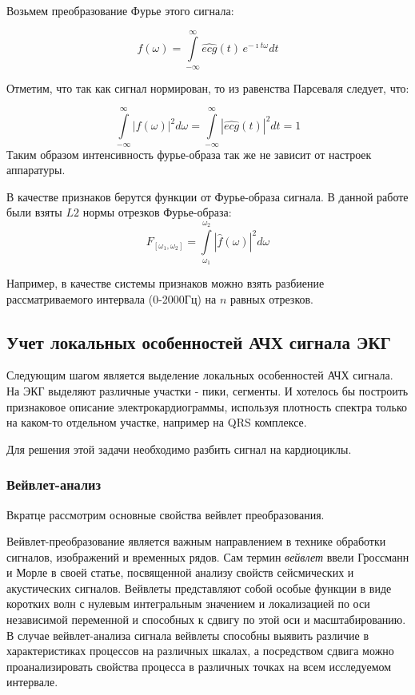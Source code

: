 \documentclass[a4paper,12pt]{extarticle}
\begin{document}
Возьмем преобразование Фурье этого сигнала:

$$f(\omega) = \int\limits_{-\infty}^{\infty} \widehat{ecg}(t)\, e^{-\imath t \omega} dt$$

Отметим, что так как сигнал нормирован, то из равенства Парсеваля следует, что:

$$ \int\limits_{-\infty}^{\infty} |f(\omega)|^2 d\omega =\int\limits_{-\infty}^{\infty} |\widehat{ecg}(t)|^2 dt = 1$$
Таким образом интенсивность фурье-образа так же не зависит от настроек аппаратуры.

В качестве признаков берутся функции от Фурье-образа сигнала. В данной работе были взяты $L2$ нормы отрезков Фурье-образа:
$$ F_[\omega_1, \omega_2] = \int\limits_{\omega_1}^{\omega_2} |\widehat{f}(\omega)|^2 d\omega $$

Например, в качестве системы признаков можно взять разбиение рассматриваемого интервала (0-2000Гц) на $n$ равных отрезков.

\subsection{Учет локальных особенностей АЧХ сигнала ЭКГ}

Следующим шагом является выделение локальных особенностей АЧХ сигнала. На ЭКГ выделяют различные участки - пики, сегменты. И хотелось бы построить признаковое описание электрокардиограммы, используя плотность спектра только на каком-то отдельном участке, например на QRS комплексе.

Для решения этой задачи необходимо разбить сигнал на кардиоциклы.

\subsubsection{Вейвлет-анализ}

Вкратце рассмотрим основные свойства вейвлет преобразования\cite{IntroWavelet03,WaveExampl10}.

Вейвлет-преобразование является важным направлением в технике обработки сигналов, изображений и временных рядов. Сам термин \textit{вейвлет} ввели Гроссманн и Морле в своей статье, посвященной анализу свойств сейсмических и акустических сигналов. Вейвлеты представляют собой особые функции в виде коротких волн с нулевым интегральным значением и локализацией по оси независимой переменной и способных к сдвигу по этой оси и масштабированию. В случае вейвлет-анализа сигнала вейвлеты способны выявить различие в характеристиках процессов на различных шкалах, а посредством сдвига можно проанализировать свойства процесса в различных точках на всем исследуемом интервале.
\end{document}
